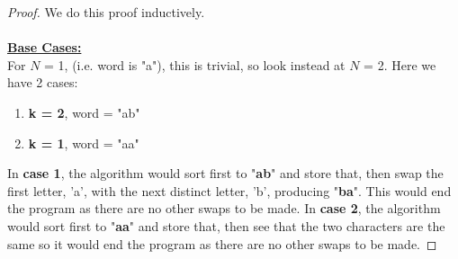 \documentclass[12pt]{article}
\begin{document}
\begin{proof}
We do this proof inductively. \\ \\
\textbf{\underline{Base Cases:}} \\
For $N$ = 1, (i.e. word is "a"), this is trivial, so look instead at $N$ = 2. Here we have 2 cases:
\begin{enumerate}
 \item \textbf{k = 2}, word = "ab"
 \item \textbf{k = 1}, word = "aa"
\end{enumerate}
In \textbf{case 1}, the algorithm would sort first to "\textbf{ab}" and store that, then swap the first letter, 'a', with the next
distinct letter, 'b', producing "\textbf{ba}". This would end the program as there are no other swaps to be made.
In \textbf{case 2}, the algorithm would sort first to "\textbf{aa}" and store that, then see that the two characters are the
same so it would end the program as there are no other swaps to be made.


\end{proof}
\end{document}
